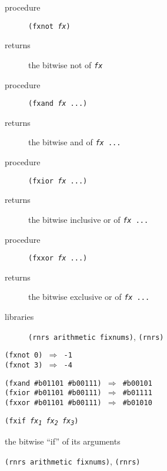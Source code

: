 \begin{description}

\label{objects_s163}\item[procedure] \texttt{(fxnot \textit{fx})}



\item[returns] the bitwise not of \texttt{\textit{fx}}


\item[procedure] \texttt{(fxand \textit{fx} ...)}



\item[returns] the bitwise and of \texttt{\textit{fx} ...}


\item[procedure] \texttt{(fxior \textit{fx} ...)}



\item[returns] the bitwise inclusive or of \texttt{\textit{fx} ...}


\item[procedure] \texttt{(fxxor \textit{fx} ...)}



\item[returns] the bitwise exclusive or of \texttt{\textit{fx} ...}


\item[libraries] \texttt{(rnrs arithmetic fixnums)}, \texttt{(rnrs)}
\end{description}


\begin{alltt}
(fxnot 0) \(\Rightarrow\) -1
(fxnot 3) \(\Rightarrow\) -4

(fxand \#{}b01101 \#{}b00111) \(\Rightarrow\) \#{}b00101
(fxior \#{}b01101 \#{}b00111) \(\Rightarrow\) \#{}b01111
(fxxor \#{}b01101 \#{}b00111) \(\Rightarrow\) \#{}b01010
\end{alltt}

\begin{description}

\label{objects_s164}\item[procedure] \texttt{(fxif \textit{fx\textsubscript{1}} \textit{fx\textsubscript{2}} \textit{fx\textsubscript{3}})}



\item[returns] the bitwise ``if'' of its arguments


\item[libraries] \texttt{(rnrs arithmetic fixnums)}, \texttt{(rnrs)}
\end{description}


